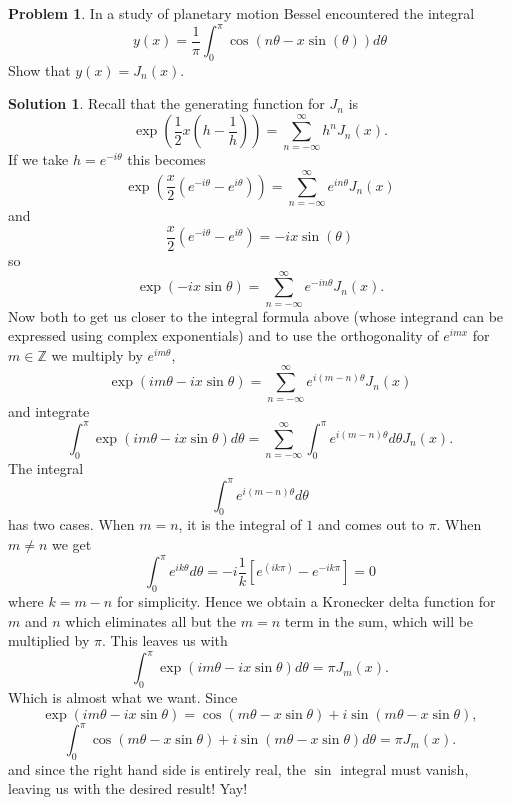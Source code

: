 \documentclass[10pt]{article}
\theoremstyle{definition}
\newtheorem{problem}{Problem}
\newtheorem{soln}{Solution}
\begin{document}
\begin{problem}
In a study of planetary motion Bessel encountered the integral
$$y(x)=\frac{1}{\pi}\int_0^\pi\cos(n\theta-x\sin(\theta))d\theta$$
Show that $y(x)=J_n(x)$.
\end{problem}
\begin{soln}
  Recall that the generating function for $J_n$ is
  $$\exp(\frac{1}{2}x(h-\frac{1}{h}))=\sum_{n=-\infty}^\infty h^n J_n(x).$$
  If we take $h=e^{-i\theta}$ this becomes
  $$\exp(\frac{x}{2}(e^{-i\theta}-e^{i\theta}))=\sum_{n=-\infty}^\infty e^{in\theta} J_n(x)$$
  and
  $$\frac{x}{2}(e^{-i\theta}-e^{i\theta})=-ix\sin(\theta)$$ so
  $$\exp(-ix\sin\theta)=\sum_{n=-\infty}^\infty e^{-in\theta} J_n(x).$$
  Now both to get us closer to the integral formula above (whose integrand can be expressed using complex exponentials) and
  to use the orthogonality of $e^{imx}$ for $m\in\mathbb{Z}$ we multiply by $e^{im\theta}$,
  $$\exp(im\theta-ix\sin\theta)=\sum_{n=-\infty}^\infty e^{i(m-n)\theta} J_n(x)$$
  and integrate
  $$\int_{0}^{\pi}\exp(im\theta-ix\sin\theta)d\theta=\sum_{n=-\infty}^\infty \int_{0}^{\pi}e^{i(m-n)\theta}d\theta J_n(x).$$
  The integral
  $$\int_{0}^{\pi}e^{i(m-n)\theta}d\theta$$
  has two cases. When $m=n$, it is the integral of $1$ and comes out to $\pi$. When $m\neq n$ we get
  $$\int_{0}^{\pi}e^{ik\theta}d\theta=-i\frac{1}{k}\left[e^(ik\pi)-e^{-ik\pi}\right]=0$$
  where $k=m-n$ for simplicity. Hence we obtain a Kronecker delta function for $m$ and $n$ which eliminates all but the $m=n$ term
  in the sum, which will be multiplied by $\pi$. This leaves us with
  $$\int_{0}^{\pi}\exp(im\theta-ix\sin\theta)d\theta=\pi J_m(x).$$
  Which is almost what we want. Since
  $$\exp(im\theta-ix\sin\theta)=\cos(m\theta-x\sin\theta)+i\sin(m\theta-x\sin\theta),$$
  $$\int_{0}^{\pi}\cos(m\theta-x\sin\theta)+i\sin(m\theta-x\sin\theta)d\theta=\pi J_m(x).$$
  and since the right hand side is entirely real, the $\sin$ integral must vanish, leaving us with the desired result! Yay!
\end{soln}
\end{document}

